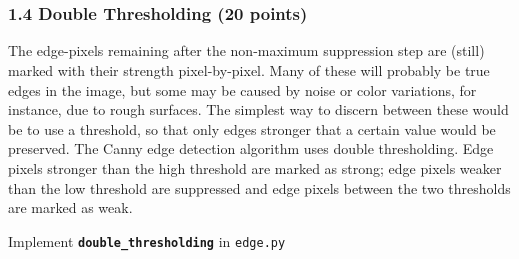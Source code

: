 \documentclass[11pt]{article}
\begin{document}
    \begin{center}
    \end{center}
    { \hspace*{\fill} \\}
    
    \begin{center}
    \end{center}
    { \hspace*{\fill} \\}
    
    \hypertarget{double-thresholding-20-points}{%
\subsubsection{1.4 Double Thresholding (20
points)}\label{double-thresholding-20-points}}

The edge-pixels remaining after the non-maximum suppression step are
(still) marked with their strength pixel-by-pixel. Many of these will
probably be true edges in the image, but some may be caused by noise or
color variations, for instance, due to rough surfaces. The simplest way
to discern between these would be to use a threshold, so that only edges
stronger that a certain value would be preserved. The Canny edge
detection algorithm uses double thresholding. Edge pixels stronger than
the high threshold are marked as strong; edge pixels weaker than the low
threshold are suppressed and edge pixels between the two thresholds are
marked as weak.

Implement \textbf{\texttt{double\_thresholding}} in \texttt{edge.py}
\end{document}
